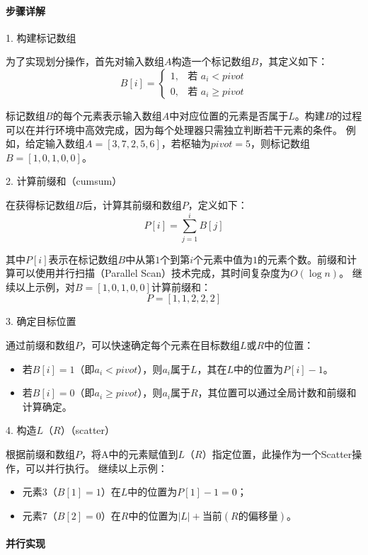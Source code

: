   \paragraph{步骤详解}

1. 构建标记数组

为了实现划分操作，首先对输入数组\(A\)构造一个标记数组\(B\)，其定义如下：
\[
B[i]=
\begin{cases}
1, & \text{若 } a_{i}<pivot\\
0, & \text{若 } a_{i}\geq pivot
\end{cases}
\]

标记数组\(B\)的每个元素表示输入数组\(A\)中对应位置的元素是否属于\(L\)。构建\(B\)的过程可以在并行环境中高效完成，因为每个处理器只需独立判断若干元素的条件。
例如，给定输入数组\(A = [3,7,2,5,6]\)，若枢轴为\(pivot = 5\)，则标记数组\(B=[1,0,1,0,0]\)。

2. 计算前缀和（cumsum）

在获得标记数组\(B\)后，计算其前缀和数组\(P\)，定义如下：
\[
P[i]=\sum_{j = 1}^{i}B[j]
\]

其中\(P[i]\)表示在标记数组\(B\)中从第\(1\)个到第\(i\)个元素中值为\(1\)的元素个数。前缀和计算可以使用并行扫描（Parallel Scan）技术完成，其时间复杂度为\(O(\log n)\)。
继续以上示例，对\(B = [1,0,1,0,0]\)计算前缀和：
\[
P=[1,1,2,2,2]
\]

3. 确定目标位置

通过前缀和数组\(P\)，可以快速确定每个元素在目标数组\(L\)或\(R\)中的位置：
\begin{itemize}
    \item 若\(B[i] = 1\)（即\(a_{i}<pivot\)），则\(a_{i}\)属于\(L\)，其在\(L\)中的位置为\(P[i] - 1\)。
    \item 若\(B[i] = 0\)（即\(a_{i}\geq pivot\)），则\(a_{i}\)属于\(R\)，其位置可以通过全局计数和前缀和计算确定。
\end{itemize}

4. 构造$L$（$R$）（scatter）

 根据前缀和数组\(P\)，将A中的元素赋值到$L$（$R$）指定位置，此操作为一个Scatter操作，可以并行执行。
继续以上示例：
\begin{itemize}
    \item 元素\(3\)（\(B[1]=1\)）在\(L\)中的位置为\(P[1] - 1 = 0\)；
    \item 元素\(7\)（\(B[2]=0\)）在\(R\)中的位置为\(\vert L\vert+\text{当前}(R\text{的偏移量})\)。
\end{itemize}




\paragraph{并行实现}


